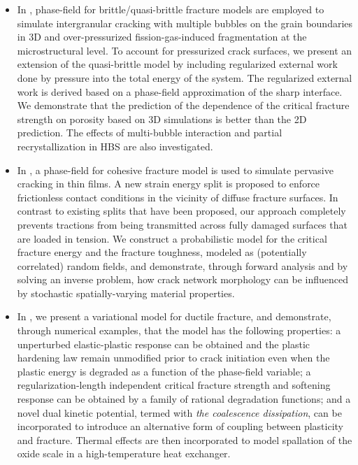 \begin{itemize}
  \item %
        In , phase-field for brittle/quasi-brittle fracture models are employed to simulate intergranular cracking with multiple bubbles on the grain boundaries in 3D and over-pressurized fission-gas-induced fragmentation at the microstructural level. To account for pressurized crack surfaces, we present an extension of the quasi-brittle model by including regularized external work done by pressure into the total energy of the system. The regularized external work is derived based on a phase-field approximation of the sharp interface. We demonstrate that the prediction of the dependence of the critical fracture strength on porosity based on 3D simulations is better than the 2D prediction. The effects of multi-bubble interaction and partial recrystallization in HBS are also investigated.
  \item %
        In , a phase-field for cohesive fracture model is used to simulate pervasive cracking in thin films. A new strain energy split is proposed to enforce frictionless contact conditions in the vicinity of diffuse fracture surfaces. In contrast to existing splits that have been proposed, our approach completely prevents tractions from being transmitted across fully damaged surfaces that are loaded in tension. We construct a probabilistic model for the critical fracture energy and the fracture toughness, modeled as (potentially correlated) random fields, and demonstrate, through forward analysis and by solving an inverse problem, how crack network morphology can be influenced by stochastic spatially-varying material properties.
  \item %
        In , we present a variational model for ductile fracture, and demonstrate, through numerical examples, that the model has the following properties: a unperturbed elastic-plastic response can be obtained and the plastic hardening law remain unmodified prior to crack initiation even when the plastic energy is degraded as a function of the phase-field variable; a regularization-length independent critical fracture strength and softening response can be obtained by a family of rational degradation functions; and a novel dual kinetic potential, termed with \emph{the coalescence dissipation}, can be incorporated to introduce an alternative form of coupling between plasticity and fracture. Thermal effects are then incorporated to model spallation of the oxide scale in a high-temperature heat exchanger.
\end{itemize}
